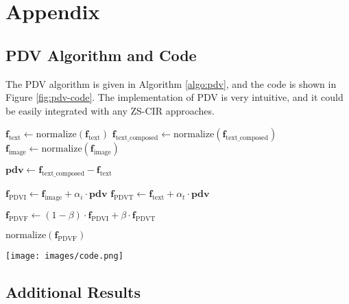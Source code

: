 \clearpage
\appendix
\section{Appendix}

\subsection{PDV Algorithm and Code}
The PDV algorithm is given in Algorithm \ref{algo:pdv}, and the code is shown in Figure \ref{fig:pdv-code}. The implementation of PDV is very intuitive, and it could be easily integrated with any ZS-CIR approaches.

\begin{algorithm}
	\caption{Calculate PDV Features}
	\label{algo:pdv}
	\begin{algorithmic}[1]
		\State $\mathbf{f}_{\text{text}} \gets \text{normalize}(\mathbf{f}_{\text{text}})$
		\State $\mathbf{f}_{\text{text\_composed}} \gets \text{normalize}(\mathbf{f}_{\text{text\_composed}})$
		\State $\mathbf{f}_{\text{image}} \gets \text{normalize}(\mathbf{f}_{\text{image}})$
		
		\State $\mathbf{pdv} \gets \mathbf{f}_{\text{text\_composed}} - \mathbf{f}_{\text{text}}$
		
		\State $\mathbf{f}_{\text{PDVI}} \gets \mathbf{f}_{\text{image}} + \alpha_i \cdot \mathbf{pdv}$
		\State $\mathbf{f}_{\text{PDVT}} \gets \mathbf{f}_{\text{text}} + \alpha_t \cdot \mathbf{pdv}$
		
		\State $\mathbf{f}_{\text{PDVF}} \gets (1 - \beta) \cdot \mathbf{f}_{\text{PDVI}} + \beta \cdot \mathbf{f}_{\text{PDVT}}$
		
		\State \Return $\text{normalize}(\mathbf{f}_{\text{PDVF}})$
		\EndFunction
	\end{algorithmic}
\end{algorithm}


\begin{figure*}[!t]
	\centering
	\texttt{[image: images/code.png]}
	\caption{Python function for calculating PDV features.}
	\label{fig:pdv-code}
\end{figure*}


\subsection{Additional Results}

